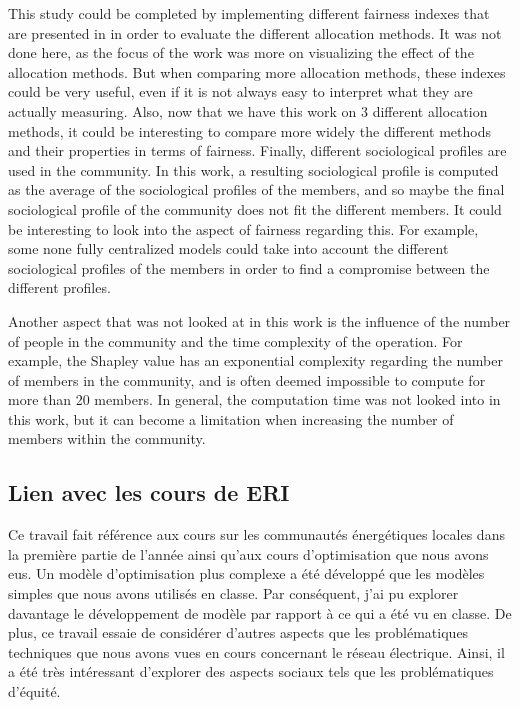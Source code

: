 This study could be completed by implementing different fairness indexes that are presented in \cite{article_1, these_new, article_8, article_2} in order to evaluate the different allocation methods. It was not done here, as the focus of the work was more on visualizing the effect of the allocation methods. But when comparing more allocation methods, these indexes could be very useful, even if it is not always easy to interpret what they are actually measuring. Also, now that we have this work on 3 different allocation methods, it could be interesting to compare more widely the different methods and their properties in terms of fairness. Finally, different sociological profiles are used in the community. In this work, a resulting sociological profile is computed as the average of the sociological profiles of the members, and so maybe the final sociological profile of the community does not fit the different members. It could be interesting to look into the aspect of fairness regarding this. For example, some none fully centralized models could take into account the different sociological profiles of the members in order to find a compromise between the different profiles. 

Another aspect that was not looked at in this work is the influence of the number of people in the community and the time complexity of the operation. For example, the Shapley value has an exponential complexity regarding the number of members in the community, and is often deemed impossible to compute for more than 20 members. In general, the computation time was not looked into in this work, but it can become a limitation when increasing the number of members within the community.

\subsection{Lien avec les cours de ERI}

Ce travail fait référence aux cours sur les communautés énergétiques locales dans la première partie de l'année ainsi qu'aux cours d'optimisation que nous avons eus. Un modèle d'optimisation plus complexe a été développé que les modèles simples que nous avons utilisés en classe. Par conséquent, j'ai pu explorer davantage le développement de modèle par rapport à ce qui a été vu en classe. De plus, ce travail essaie de considérer d'autres aspects que les problématiques techniques que nous avons vues en cours concernant le réseau électrique. Ainsi, il a été très intéressant d'explorer des aspects sociaux tels que les problématiques d'équité.

